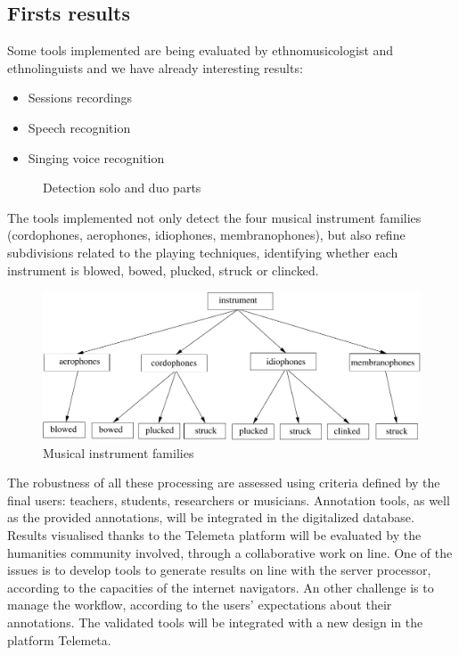 \documentclass{sig-alternate}
\begin{document}
\subsection{Firsts results}

Some tools implemented are being evaluated by ethnomusicologist and ethnolinguists and we have already interesting results:

\begin{itemize}
\item Sessions recordings
\item Speech recognition
\item Singing voice recognition
\end{itemize}





\begin{figure}
  \centering
  \caption{Detection solo and duo parts}
\end{figure}


The tools implemented not only detect the four musical instrument families (cordophones, aerophones, idiophones, membranophones), but also refine subdivisions related to the playing techniques, identifying whether each instrument is blowed, bowed, plucked, struck or clincked.
\begin{figure}
  \centering
  \includegraphics[width=0.9\linewidth]{img/taxonomie_diadems.pdf}
  \caption{Musical instrument families}
  \label{fig:instruments}
\end{figure}

The robustness of all these processing are assessed using criteria defined by the final users: teachers, students, researchers or musicians. Annotation tools, as well as the provided annotations, will be integrated in the digitalized database. Results visualised thanks to the Telemeta platform will be evaluated by the humanities community involved, through a collaborative work on line. One of the issues is to develop tools to generate results on line with the server processor, according to the capacities of the internet navigators. An other challenge is to manage the workflow, according to the users' expectations about their annotations. The validated tools will be integrated with a new design in the platform Telemeta.
\end{document}
